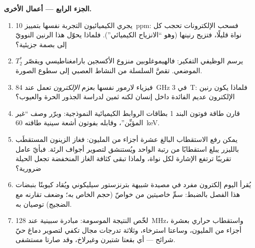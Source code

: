 \begin{problem}
\medskip\noindent\textbf{الجزء الرابع --- أعمال  الأخرى.}
\begin{enumerate}[resume]
  \item يجري الكيميائيون التجربة نفسها بتمييز \qty{10}{ppm}:
        فسحب الإلكترونات تحجب كل نواة قليلًا،
        فتزيح رنينها (وهو ``الانزياح الكيميائي''). فلماذا يحوّل
        هذا الرنين النوويّ إلى بصمة جزيئية؟
  \item يرسم  الوظيفي التفكير: فالهيموغلوبين
        منزوع الأكسجين بارامغناطيسي ويقصّر $T_2^*$ الموضعي.
        تقصَّ السلسلة من النشاط العصبي إلى سطوع الصورة.
  \item فيزياء لارمور نفسها بعزم \emph{الإلكترون} تعمل
        عند \qty{84}{GHz} في \qty{3}{T}: فلماذا يكون رنين
        الإلكترون عديم الفائدة داخل إنسان لكنه ثمين لدراسة
        الجذور الحرة والعيوب؟
  \item قارن طاقة فوتون البند 1 بطاقات الروابط
        الكيميائية النموذجية: وبرّر وصف ``غير المؤيِّن''،
        وقابله بفوتون أشعة سينية طاقته \qty{60}{keV}.
  \item يمكن رفع الاستقطاب البالغ عشرة أجزاء من المليون:
        فغاز الزينون المستقطَب بالليزر يبلغ استقطابًا من رتبة الواحد ويُستنشق
        لتصوير أجواف الرئة. فبأيّ عامل تقريبًا ترتفع الإشارة
        لكل نواة، ولماذا تبقى كثافة الغاز المنخفضة تجعل
        الحيلة ضرورية؟
  \item يُقرأ اليوم  إلكترون مفرد في مصيدة شبيهة بترنزستور
        سيليكوني ويُقاد كيوبتًا بنبضات هذا الفصل
        بالضبط: سمِّ خاصيتين من خواصّ  (حجم
         الخاص به؛ وضعف تقارنه مع الضجيج) توصيان به.
  \item لخّص النتيجة الموسومة: مبادرة سبينية عند \qty{128}{MHz}،
        واستقطاب حراري بعشرة أجزاء من المليون،
        وساعتا استرخاء، وثلاثة تدرجات مجال تكفي
        لتصوير دماغ حيّ شرائح --- أي بقعتا شتيرن وغيرلاخ،
        وقد صارتا مستشفى.
\end{enumerate}
\end{problem}
